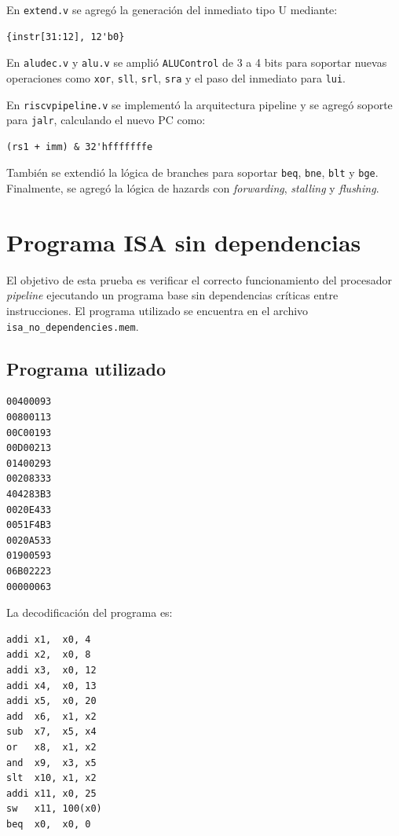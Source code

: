 En \texttt{extend.v} se agregó la generación del inmediato tipo U mediante:

\begin{verbatim}
{instr[31:12], 12'b0}
\end{verbatim}

En \texttt{aludec.v} y \texttt{alu.v} se amplió \texttt{ALUControl} de 3 a 4 bits para soportar nuevas operaciones como \texttt{xor}, \texttt{sll}, \texttt{srl}, \texttt{sra} y el paso del inmediato para \texttt{lui}.

En \texttt{riscvpipeline.v} se implementó la arquitectura pipeline y se agregó soporte para \texttt{jalr}, calculando el nuevo PC como:

\begin{verbatim}
(rs1 + imm) & 32'hfffffffe
\end{verbatim}

También se extendió la lógica de branches para soportar \texttt{beq}, \texttt{bne}, \texttt{blt} y \texttt{bge}. Finalmente, se agregó la lógica de hazards con \textit{forwarding}, \textit{stalling} y \textit{flushing}.

\section{Programa ISA sin dependencias}

El objetivo de esta prueba es verificar el correcto funcionamiento del procesador \textit{pipeline} ejecutando un programa base sin dependencias críticas entre instrucciones. El programa utilizado se encuentra en el archivo \texttt{isa\_no\_dependencies.mem}.

\subsection{Programa utilizado}

\begin{verbatim}
00400093
00800113
00C00193
00D00213
01400293
00208333
404283B3
0020E433
0051F4B3
0020A533
01900593
06B02223
00000063
\end{verbatim}

La decodificación del programa es:

\begin{verbatim}
addi x1,  x0, 4
addi x2,  x0, 8
addi x3,  x0, 12
addi x4,  x0, 13
addi x5,  x0, 20
add  x6,  x1, x2
sub  x7,  x5, x4
or   x8,  x1, x2
and  x9,  x3, x5
slt  x10, x1, x2
addi x11, x0, 25
sw   x11, 100(x0)
beq  x0,  x0, 0
\end{verbatim}

